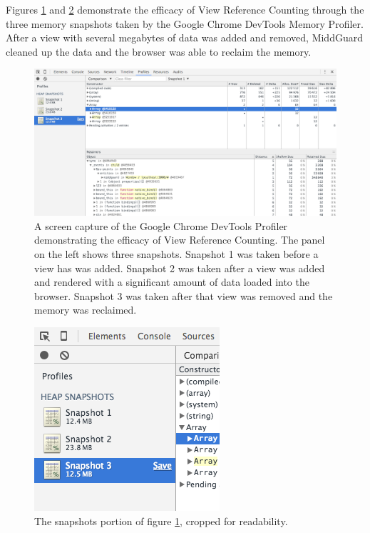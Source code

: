 \documentclass[midd]{thesis}
\begin{document}
Figures \ref{fig:vrc} and \ref{fig:vrccropped} demonstrate the efficacy of View
Reference Counting through the three memory snapshots taken by the Google Chrome
DevTools Memory Profiler. After a view with several megabytes of data was added
and removed, MiddGuard cleaned up the data and the browser was able to reclaim
the memory.

\begin{figure}[!ht]
  \centering
  \includegraphics[width=1\textwidth]{devtools-snapshot}
  \caption[Browser memory profiles with View Reference Counting.]{A screen
  capture of the Google Chrome DevTools Profiler demonstrating the efficacy of
  View Reference Counting. The panel on the left shows three snapshots. Snapshot
  1 was taken before a view has was added. Snapshot 2 was taken after a view was
  added and rendered with a significant amount of data loaded into the browser.
  Snapshot 3 was taken after that view was removed and the memory was
  reclaimed.}
  \label{fig:vrc}
\end{figure}

\begin{figure}[!ht]
  \centering
  \includegraphics{devtools-snapshot-cropped}
  \caption{The snapshots portion of figure \ref{fig:vrc}, cropped for
  readability.}
  \label{fig:vrccropped}
\end{figure}
\end{document}
